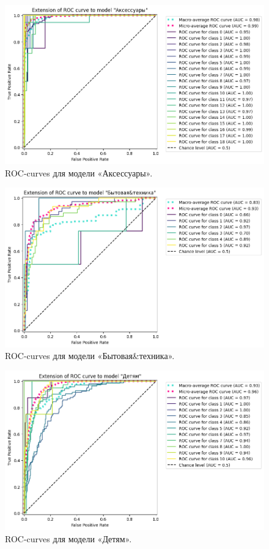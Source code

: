 \documentclass[a4paper,12pt]{extarticle}
\begin{document}
\begin{figure}[hbtp]
	\centering
	\includegraphics[scale=0.7]{roc_curves/roccurve_Аксессуары.png}
	\caption{ROC-curves для модели «Аксессуары».}
	\label{fig:roccurve_Аксессуары}
\end{figure}

\begin{figure}[hbtp]
	\centering
	\includegraphics[scale=0.7]{roc_curves/roccurve_Бытовая&техника.png}
	\caption{ROC-curves для модели «Бытовая\&техника».}
	\label{fig:roccurve_Бытовая&техника}
\end{figure}

\begin{figure}[hbtp]
	\centering
	\includegraphics[scale=0.7]{roc_curves/roccurve_Детям.png}
	\caption{ROC-curves для модели «Детям».}
	\label{fig:roccurve_Детям}
\end{figure}
\end{document}
